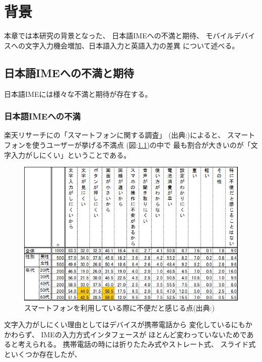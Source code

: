 \chapter{背景}
\label{chap:background}
本章では本研究の背景となった、
日本語IMEへの不満と期待、
モバイルデバイスへの文字入力機会増加、日本語入力と英語入力の差異
について述べる。

\newpage
\section{日本語IMEへの不満と期待}
日本語IMEには様々な不満と期待が存在する。

\subsection{日本語IMEへの不満}
楽天リサーチにの「スマートフォンに関する調査」
(出典:\cite{rakutensmartphone})によると、
スマートフォンを使うユーザーが挙げる不満点
(図:\ref{fig:dissatisfaction})の中で
最も割合が大きいのが「文字入力がしにくい」ということである。
\begin{figure}[htbp]
  \begin{center}
    \includegraphics[width=140mm,bb=0 0 589 368]{images/dissatisfaction.png}
  \end{center}
  \caption{スマートフォンを利用している際に不便だと感じる点(出典:\cite{rakutensmartphone})}
  \label{fig:dissatisfaction}
\end{figure}
文字入力がしにくい理由としてはデバイスが携帯電話から
変化しているにもかかわらず、
IMEの入力方式インタフェースが
ほとんど変わっていないためであると考えられる。
携帯電話の時には折りたたみ式やストレート式、
スライド式といくつか存在したが、
